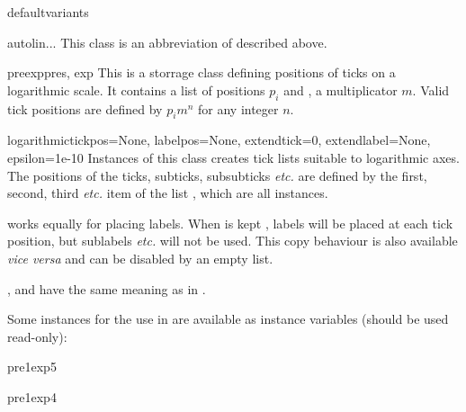 \begin{memberdesc}{defaultvariants}
\end{memberdesc}

\begin{classdesc}{autolin}{...}
This class is an abbreviation of  described above.
\end{classdesc}

\begin{classdesc}{preexp}{pres, exp}
  This is a storrage class defining positions of ticks on a
  logarithmic scale. It contains a list  of positions $p_i$
  and , a multiplicator $m$. Valid tick positions are defined
  by $p_im^n$ for any integer $n$.
\end{classdesc}

\begin{classdesc}{logarithmic}{tickpos=None, labelpos=None,
                               extendtick=0, extendlabel=None,
                               epsilon=1e-10}
  Instances of this class creates tick lists suitable to logarithmic
  axes. The positions of the ticks, subticks, subsubticks \emph{etc.}
  are defined by the first, second, third \emph{etc.} item of the list
  , which are all  instances.

   works equally for placing labels. When 
  is kept , labels will be placed at each tick position,
  but sublabels \emph{etc.} will not be used. This copy behaviour is
  also available \emph{vice versa} and can be disabled by an empty
  list.

  ,  and  have the same
  meaning as in .
\end{classdesc}

Some  instances for the use in  are
available as instance variables (should be used read-only):

\begin{memberdesc}{pre1exp5}
\end{memberdesc}

\begin{memberdesc}{pre1exp4}
\end{memberdesc}

